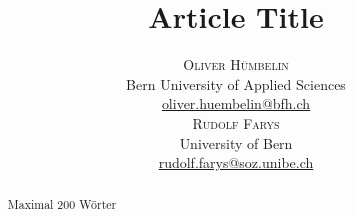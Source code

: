 \documentclass[twoside]{article}\usepackage[]{graphicx}\usepackage[]{color}
\title{\vspace{-15mm}\fontsize{24pt}{10pt}\selectfont\textbf{Article Title}} %
\author{
\large
\textsc{Oliver Hümbelin}\\[2mm] %
\normalsize Bern University of Applied Sciences \\ %
\normalsize \href{mailto:oliver.huembelin@bfh.ch}{oliver.huembelin@bfh.ch} %
\vspace{5mm}\\
\large
\textsc{Rudolf Farys}\\[2mm] %
\normalsize University of Bern \\ %
\normalsize \href{mailto:rudolf.farys@soz.unibe.ch}{rudolf.farys@soz.unibe.ch} %
\vspace{-5mm}
}
\date{}
\begin{document}
\maketitle %

\thispagestyle{fancy} %





\begin{abstract}

Maximal 200 Wörter

\end{abstract}




\end{document}
